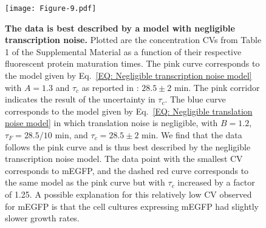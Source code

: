 \documentclass[%
 reprint,prx,
superscriptaddress,
%
%
%
%
%
%
%
%
%
 amsmath,amssymb,
 aps,
%
%
%
%
%
%
]{revtex4-2}
\begin{document}
{{\begin{figure}[htp]
\texttt{[image: Figure-9.pdf]}
\caption{ {\textbf{The data is best described by a model with negligible transcription noise.} Plotted are the concentration CVs from Table 1 of the Supplemental Material \cite{SI} as a function of their respective fluorescent protein maturation times. The pink curve corresponds to the model given by Eq.~\eqref{EQ: Negligible transcription noise model} with $A = 1.3$ and $\tau_{c}$ as reported in \cite{Balleza2018}: $28.5\pm2$ min. The pink corridor indicates the result of the uncertainty in $\tau_{c}$. The blue curve corresponds to the model given by Eq.~\eqref{EQ: Negligible translation noise model} in which translation noise is negligible, with $B = 1.2$, $\tau_{F} = 28.5/10$ min, and $\tau_{c} = 28.5\pm2$ min. We find that the data follows the pink curve and is thus best described by the negligible transcription noise model. The data point with the smallest CV corresponds to mEGFP, and the dashed red curve corresponds to the same model as the pink curve but with $\tau_{c}$ increased by a factor of 1.25. A possible explanation for this relatively low CV observed for mEGFP is that the cell cultures expressing mEGFP had slightly slower growth rates.}}
\label{FIG: CV plot}
\end{figure} 

}}
\end{document}
